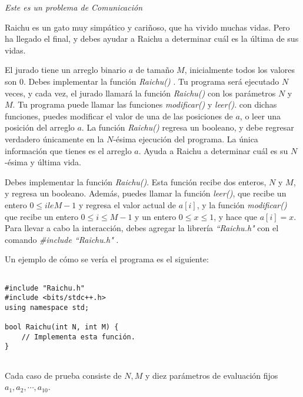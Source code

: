 \documentclass[12pt]{scrartcl}
\begin{document}
    
    {\itshape Este es un problema de Comunicación}
    
    \vspace{10pt}

        Raichu es un gato muy simpático y cariñoso, que ha vivido muchas vidas. Pero ha llegado el final, y debes ayudar a Raichu a determinar cuál es la última de sus vidas. 


        El jurado tiene un arreglo binario $a$ de tamaño $M$, inicialmente todos los valores son $0$. Debes implementar la función {\itshape Raichu()} . Tu programa será ejecutado $N$  veces, y cada vez, el jurado llamará la función {\itshape Raichu()} con los parámetros $N$ y $M$. Tu programa puede llamar las funciones {\itshape modificar() } y {\itshape leer()}. con dichas funciones, puedes modificar el valor de una de las posiciones de $a$, o leer una posición del arreglo $a$. La función {\itshape Raichu()} regresa un booleano, y debe regresar verdadero únicamente en la $N$-ésima ejecución del programa. La única información que tienes es el arreglo $a$. Ayuda a Raichu a determinar cuál es su $N$-ésima y última vida.



        Debes implementar la función {\itshape Raichu()}. Esta función recibe dos enteros, $N$ y $M$, y regresa un booleano. Además, puedes llamar la función {\itshape leer()}, que recibe un entero $0 \le i le M - 1$ y regresa el valor actual de $a[i]$, y la función {\itshape modificar()} que recibe un entero $0 \le i \le M - 1$ y un entero $0 \le x \le 1$, y hace que $a[i] = x$.
        Para llevar a cabo la interacción, debes agregar la librería \textit{``Raichu.h" } con el comando \textit{\#include ``Raichu.h" }. 

        Un ejemplo de cómo se vería el programa es el siguiente:

\begin{verbatim}

#include "Raichu.h"
#include <bits/stdc++.h>
using namespace std;

bool Raichu(int N, int M) {
    // Implementa esta función.
}
    
\end{verbatim}
        


        Cada caso de prueba consiste de $N, M$ y diez parámetros de evaluación fijos $a_1, a_2, \cdots, a_{10}$.
\end{document}
